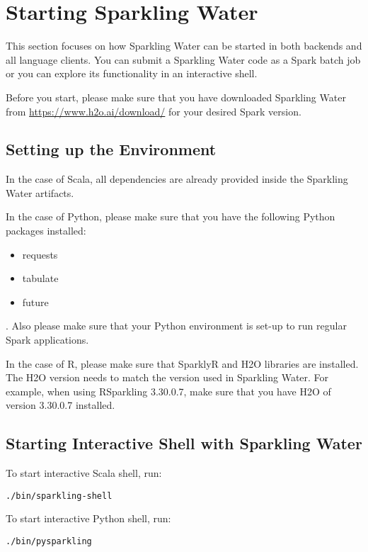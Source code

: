 \section{Starting Sparkling Water}

This section focuses on how Sparkling Water can be started in both backends and all language clients.
You can submit a Sparkling Water code as a Spark batch job or you can explore its functionality in an interactive shell.

Before you start, please make sure that you have downloaded Sparkling Water from \url{https://www.h2o.ai/download/} for
your desired Spark version.

\subsection{Setting up the Environment}

In the case of Scala, all dependencies are already provided inside the Sparkling Water artifacts.

In the case of Python, please make sure that you have the following Python packages installed:
\begin{itemize}
    \item requests
    \item tabulate
    \item future
\end{itemize}.
Also please make sure that your Python environment is set-up to run regular Spark applications.

In the case of R, please make sure that SparklyR and H2O libraries are installed. The H2O version needs to match the version
used in Sparkling Water. For example, when using RSparkling 3.30.0.7, make sure that you have H2O of version 3.30.0.7 installed.

\subsection{Starting Interactive Shell with Sparkling Water}

To start interactive Scala shell, run:

\begin{lstlisting}[style=bash]
./bin/sparkling-shell
\end{lstlisting}

To start interactive Python shell, run:

\begin{lstlisting}[style=bash]
./bin/pysparkling
\end{lstlisting}

